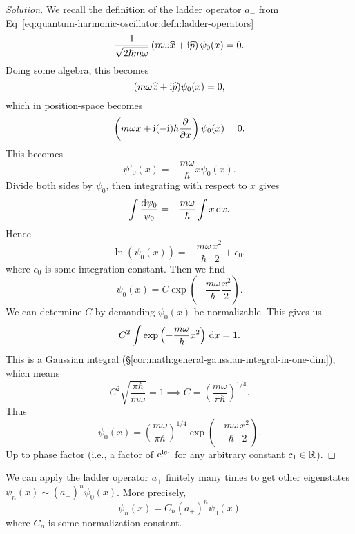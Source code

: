 \begin{proof}[Solution]
We recall the definition of the ladder operator $a_{-}$ from Eq~\eqref{eq:quantum-harmonic-oscillator:defn:ladder-operators}
\begin{equation}
\frac{1}{\sqrt{2\hbar m\omega}}\left(m\omega \widehat{x}+\mathrm{i}\widehat{p}\right)\psi_{0}(x)=0.
\end{equation}
Doing some algebra, this becomes
\begin{equation}
(m\omega\widehat{x} + \mathrm{i}\widehat{p})\psi_{0}(x) = 0,
\end{equation}
which in position-space becomes
\begin{equation}
\left(m\omega x + \mathrm{i}(-\mathrm{i})\hbar\frac{\partial}{\partial x}\right)\psi_{0}(x)=0.
\end{equation}
This becomes
\begin{equation}
\psi'_{0}(x) = -\frac{m\omega}{\hbar}x\psi_{0}(x).
\end{equation}
Divide both sides by $\psi_{0}$, then integrating with respect to $x$
gives
\begin{equation}
\int\frac{\mathrm{d}\psi_{0}}{\psi_{0}} = -\frac{m\omega}{\hbar}\int x\,\mathrm{d} x.
\end{equation}
Hence
\begin{equation}
\ln(\psi_{0}(x)) = -\frac{m\omega}{\hbar}\frac{x^{2}}{2} + c_{0},
\end{equation}
where $c_{0}$ is some integration constant.
Then we find
\begin{equation}
\psi_{0}(x) = C\exp\left(-\frac{m\omega}{\hbar}\frac{x^{2}}{2}\right).
\end{equation}
We can determine $C$ by demanding $\psi_{0}(x)$ be normalizable. This
gives us
\begin{equation}
C^{2}\int\exp\left(-\frac{m\omega}{\hbar}x^{2}\right)\,\mathrm{d} x = 1.
\end{equation}
This is a Gaussian integral (\S\ref{cor:math:general-gaussian-integral-in-one-dim}), which means
\begin{equation}
C^{2}\sqrt{\frac{\pi\hbar}{m\omega}}=1\implies C=\left(\frac{m\omega}{\pi\hbar}\right)^{1/4}.
\end{equation}
Thus
\begin{equation}
\boxed{\psi_{0}(x) = \left(\frac{m\omega}{\pi\hbar}\right)^{1/4}\exp\left(-\frac{m\omega}{\hbar}\frac{x^{2}}{2}\right).}
\end{equation}
Up to phase factor (i.e., a factor of $\mathrm{e}^{\mathrm{i} c_{1}}$ for any
arbitrary constant $c_{1}\in\mathbb{R}$).
\end{proof}

We can apply the ladder operator $a_{+}$ finitely many times to get
other eigenstates $\psi_{n}(x)\sim(a_{+})^{n}\psi_{0}(x)$. More
precisely,
\begin{equation}
\psi_{n}(x) = C_{n}(a_{+})^{n}\psi_{0}(x)
\end{equation}
where $C_{n}$ is some normalization constant.
